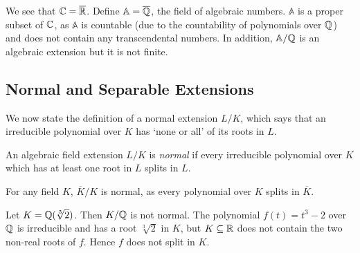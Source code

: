 We see that $\mathbb C = \overline {\mathbb R} $. Define $ \mathbb A = \overline {\mathbb Q}$, the field of algebraic numbers. $\mathbb A$ is a proper subset of $\mathbb C$, as $\mathbb A$ is countable (due to the countability of polynomials over $\mathbb Q$) and does not contain any transcendental numbers. In addition, $\mathbb A / \mathbb Q$ is an algebraic extension but it is not finite.  

%
%

%



\subsection{Normal and Separable Extensions}

We now state the definition of a normal extension $L/K$, which says that an irreducible polynomial over $K$ has `none or all' of its roots in $L$. 

\begin{definition}
    An algebraic field extension $L/ K$ is \textit{normal} if every irreducible polynomial over $K$ which has at least one root in $L$ splits in $L$. 
\end{definition}

\begin{example}
	For any field $K$, $\overline K / K$ is normal, as every polynomial over $K$ splits in $\overline K$. 
\end{example}


\begin{example}
    Let $K = \mathbb Q(\sqrt[3]{2})$. Then $K / \mathbb Q$ is not normal. The polynomial $f(t) = t^3 - 2$ over $\mathbb Q$ is irreducible and has a root $\sqrt[3]{2}$ in $K$, but $K \subseteq \mathbb R$ does not contain the two non-real roots of $f$. Hence $f$ does not split in $K$.
\end{example}

